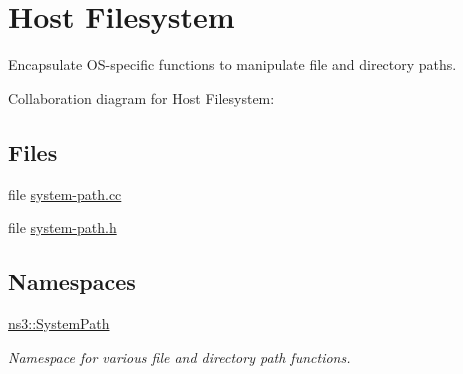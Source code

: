 \hypertarget{group__systempath}{}\section{Host Filesystem}
\label{group__systempath}


Encapsulate O\+S-\/specific functions to manipulate file and directory paths.  


Collaboration diagram for Host Filesystem\+:
\subsection*{Files}
\begin{DoxyCompactItemize}
\item 
file \hyperlink{system-path_8cc}{system-\/path.\+cc}
\item 
file \hyperlink{system-path_8h}{system-\/path.\+h}
\end{DoxyCompactItemize}
\subsection*{Namespaces}
\begin{DoxyCompactItemize}
\item 
 \hyperlink{namespacens3_1_1SystemPath}{ns3\+::\+System\+Path}
\begin{DoxyCompactList}\small\item\em Namespace for various file and directory path functions. \end{DoxyCompactList}\end{DoxyCompactItemize}
